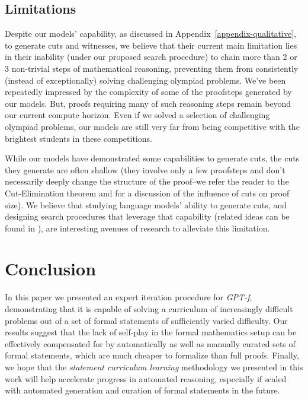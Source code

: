\documentclass[nohyperref]{article}
\theoremstyle{plain}
\theoremstyle{definition}
\theoremstyle{remark}
\begin{document}
\subsection{Limitations}
\label {limitations}

Despite our models' capability, as discussed in Appendix~\ref{appendix-qualitative}, to generate cuts and witnesses, we believe that their current main limitation lies in their inability (under our proposed search procedure) to chain more than 2 or 3 non-trivial steps of mathematical reasoning, preventing them from consistently (instead of exceptionally) solving challenging olympiad problems. We've been repeatedly impressed by the complexity of some of the proofsteps generated by our models. But, proofs requiring many of such reasoning steps remain beyond our current compute horizon. Even if we solved a selection of challenging olympiad problems, our models are still very far from being competitive with the brightest students in these competitions.

While our models have demonstrated some capabilities to generate cuts, the cuts they generate are often shallow (they involve only a few proofsteps and don't necessarily deeply change the structure of the proof--we refer the reader to the Cut-Elimination theorem and \citet{carbone1996cuts} for a discussion of the influence of cuts on proof size). We believe that studying language models' ability to generate cuts, and designing search procedures that leverage that capability (related ideas can be found in \citet{czechowski2021subgoal}), are interesting avenues of research to alleviate this limitation.

\section{Conclusion}

In this paper we presented an expert iteration procedure for \textit{GPT-f}\cite{polu2020generative}, demonstrating that it is capable of solving a curriculum of increasingly difficult problems out of a set of formal statements of sufficiently varied difficulty. Our results suggest that the lack of self-play in the formal mathematics setup can be effectively compensated for by automatically as well as manually curated sets of formal statements, which are much cheaper to formalize than full proofs. Finally, we hope that the \textit{statement curriculum learning} methodology we presented in this work will help accelerate progress in automated reasoning, especially if scaled with automated generation and curation of formal statements in the future.
\end{document}
